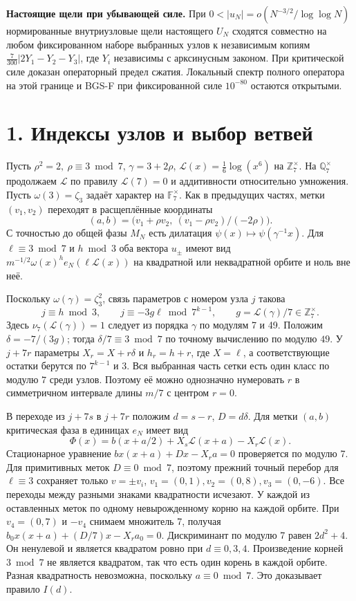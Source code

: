 \documentclass[11pt,a4paper]{article}
\newcommand{\sect}[1]{\section*{\sffamily\color{ink}#1}}
\newcommand{\subt}[1]{\par\medskip\noindent\textbf{#1.}\quad}
\newcommand{\Zp}{\mathbb Z_7}
\newcommand{\Qp}{\mathbb Q_7}
\begin{document}
\subt{Настоящие щели при убывающей силе}
При \(0<|u_N|=o(N^{-3/2}/\log\log N)\) нормированные внутриузловые щели настоящего \(U_N\) сходятся совместно на любом фиксированном наборе выбранных узлов к независимым копиям \(\tfrac7{300}|2Y_1-Y_2-Y_3|\), где \(Y_i\) независимы с арксинусным законом. При критической силе доказан операторный предел сжатия. Локальный спектр полного оператора на этой границе и BGS-F при фиксированной силе \(10^{-80}\) остаются открытыми.
\newpage
\sect{1. Индексы узлов и выбор ветвей}
Пусть \(\rho^2=2,\ \rho\equiv3\bmod7\), \(\gamma=3+2\rho\), \(\mathcal L(x)=\tfrac16\log(x^6)\) на \(\Zp^\times\). На \(\Qp^\times\) продолжаем \(\mathcal L\) по правилу \(\mathcal L(7)=0\) и аддитивности относительно умножения. Пусть \(\omega(3)=\zeta_3\) задаёт характер на \(\mathbb F_7^\times\). Как в предыдущих частях, метки \((v_1,v_2)\) переходят в расщеплённые координаты
\[
       (a,b)=\bigl(v_1+\rho v_2,\ (v_1-\rho v_2)/(-2\rho)\bigr).
\]
С точностью до общей фазы \(M_N\) есть дилатация \(\psi(x)\mapsto\psi(\gamma^{-1}x)\). Для \(\ell\equiv3\bmod7\) и \(h\bmod3\) оба вектора \(u_\pm\) имеют вид \(m^{-1/2}\omega(x)^h e_N(\ell\mathcal L(x))\) на квадратной или неквадратной орбите и ноль вне неё.

Поскольку \(\omega(\gamma)=\zeta_3^2\), связь параметров с номером узла \(j\) такова
\[
      j\equiv h\bmod3,\qquad
      j\equiv -3g\ell\bmod7^{k-1},\qquad
                         g=\mathcal L(\gamma)/7\in\Zp^\times .
\]
Здесь \(\nu_7(\mathcal L(\gamma))=1\) следует из порядка \(\gamma\) по модулям 7 и 49. Положим \(\delta=-7/(3g)\); тогда \(\delta/7\equiv3\bmod7\) по точному вычислению по модулю \(49\). У \(j+7r\) параметры \(X_r=X+r\delta\) и \(h_r=h+r\), где \(X=\ell\), а соответствующие остатки берутся по \(7^{k-1}\) и \(3\). Вся выбранная часть сетки есть один класс по модулю \(7\) среди узлов. Поэтому её можно однозначно нумеровать \(r\) в симметричном интервале длины \(m/7\) с центром \(r=0\).

В переходе из \(j+7s\) в \(j+7r\) положим \(d=s-r\), \(D=d\delta\). Для метки \((a,b)\) критическая фаза в единицах \(e_N\) имеет вид
\[
 \Phi(x)=b(x+a/2)+X_s\mathcal L(x+a)-X_r\mathcal L(x).
\]
Стационарное уравнение \(b x(x+a)+D x-X_r a=0\) проверяется по модулю 7. Для примитивных меток \(D\equiv0\bmod7\), поэтому прежний точный перебор для \(\ell\equiv3\) сохраняет только \(v=\pm v_i\), \(v_1=(0,1),v_2=(0,8),v_3=(0,-6)\). Все переходы между разными знаками квадратности исчезают. У каждой из оставленных меток по одному невырожденному корню на каждой орбите. При \(v_4=(0,7)\) и \(-v_4\) снимаем множитель 7, получая \(b_0 x(x+a)+(D/7)x-X_r a_0=0\). Дискриминант по модулю 7 равен \(2d^2+4\). Он ненулевой и является квадратом ровно при \(d\equiv0,3,4\). Произведение корней \(3\bmod7\) не является квадратом, так что есть один корень в каждой орбите. Разная квадратность невозможна, поскольку \(a\equiv0\bmod7\). Это доказывает правило \(I(d)\).
\end{document}
